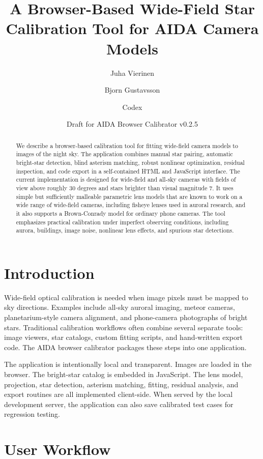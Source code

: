 \documentclass[11pt]{article}
\title{A Browser-Based Wide-Field Star Calibration Tool for AIDA Camera Models}
\author{Juha Vierinen \and Bjorn Gustavsson \and Codex}
\date{Draft for AIDA Browser Calibrator v0.2.5}
\begin{document}
\maketitle

\begin{abstract}
We describe a browser-based calibration tool for fitting wide-field camera
models to images of the night sky. The application combines manual star
pairing, automatic bright-star detection, blind asterism matching, robust
nonlinear optimization, residual inspection, and code export in a self-contained
HTML and JavaScript interface. The current implementation is designed for
wide-field and all-sky cameras with fields of view above roughly 30 degrees and
stars brighter than visual magnitude 7. It uses simple but sufficiently
malleable parametric lens models that are known to work on a wide range of
wide-field cameras, including fisheye lenses used in auroral research, and it
also supports a Brown-Conrady model for ordinary phone cameras. The tool
emphasizes practical calibration under imperfect observing conditions,
including aurora, buildings, image noise, nonlinear lens effects, and spurious
star detections.
\end{abstract}

\section{Introduction}

Wide-field optical calibration is needed when image pixels must be mapped to
sky directions. Examples include all-sky auroral imaging, meteor cameras,
planetarium-style camera alignment, and phone-camera photographs of bright
stars. Traditional calibration workflows often combine several separate tools:
image viewers, star catalogs, custom fitting scripts, and hand-written export
code. The AIDA browser calibrator packages these steps into one application.

The application is intentionally local and transparent. Images are loaded in the
browser. The bright-star catalog is embedded in JavaScript. The lens model,
projection, star detection, asterism matching, fitting, residual analysis, and
export routines are all implemented client-side. When served by the local
development server, the application can also save calibrated test cases for
regression testing.

\section{User Workflow}
\end{document}
